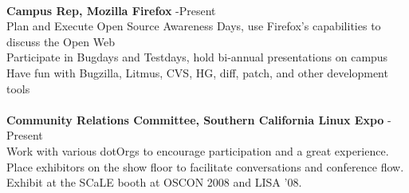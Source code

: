 \documentclass{res}
\begin{document}
\begin{resume}
\begin{tabbing}
\\

    {\bf Campus Rep, Mozilla Firefox} \> -Present\\
	 Plan and Execute Open Source Awareness Days, use Firefox's capabilities to discuss the Open Web \\
	 Participate in Bugdays and Testdays, hold bi-annual presentations on campus \\
	 Have fun with Bugzilla, Litmus, CVS, HG, diff, patch, and other development tools\\

\\

    {\bf Community Relations Committee, Southern California Linux Expo} \> -Present\\
	 Work with various dotOrgs to encourage participation and a great experience.\\
	 Place exhibitors on the show floor to facilitate conversations and conference flow.\\
	 Exhibit at the SCaLE booth at OSCON 2008 and LISA '08.
	 \end{tabbing}

\end{resume}
\end{document}
